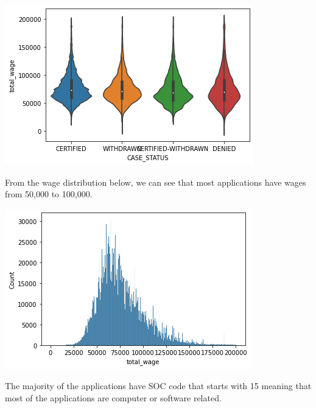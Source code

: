 \documentclass{article}
\begin{document}
\begin{multicols}{2}
\includegraphics[scale=0.5]{figures/wage_violin.png}

From the wage distribution below, we can see that most applications have wages from 50,000 to 100,000.

\includegraphics[scale=0.5]{figures/wage_hist.png}

The majority of the applications have SOC code that starts with 15 meaning that most of the applications are computer or software related.


\end{multicols}
\end{document}

